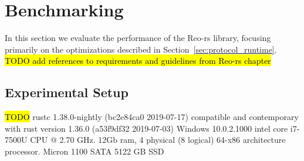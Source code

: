 \chapter{Benchmarking}
\label{sec:benchmarking}

In this section we evaluate the performance of the Reo-rs library, focusing primarily on the optimizations described in Section~\ref{sec:protocol_runtime}.
\hl{TODO add references to requirements and guidelines from Reo-rs chapter}

\section{Experimental Setup}
\hl{TODO}
rustc 1.38.0-nightly (bc2e84ca0 2019-07-17)
compatible and contemporary with rust version 1.36.0 (a53f9df32 2019-07-03)
Windows 10.0.2.1000 intel core i7-7500U CPU @ 2.70 GHz. 12Gb ram, 4 physical (8 logical) 64-x86 architecture processor. Micron 1100 SATA 5122 GB SSD 



